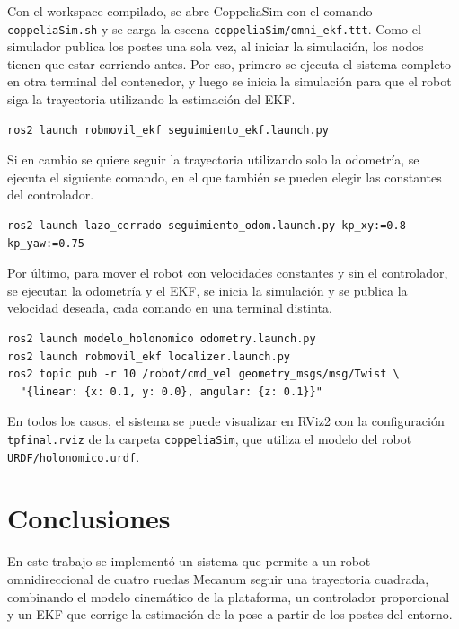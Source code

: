 \documentclass[11pt,a4paper]{article}
\begin{document}
Con el workspace compilado, se abre CoppeliaSim con el comando \texttt{coppeliaSim.sh} y se carga la escena \texttt{coppeliaSim/omni\_ekf.ttt}. Como el simulador publica los postes una sola vez, al iniciar la simulación, los nodos tienen que estar corriendo antes. Por eso, primero se ejecuta el sistema completo en otra terminal del contenedor, y luego se inicia la simulación para que el robot siga la trayectoria utilizando la estimación del EKF.

\begin{verbatim}
ros2 launch robmovil_ekf seguimiento_ekf.launch.py
\end{verbatim}

Si en cambio se quiere seguir la trayectoria utilizando solo la odometría, se ejecuta el siguiente comando, en el que también se pueden elegir las constantes del controlador.

\begin{verbatim}
ros2 launch lazo_cerrado seguimiento_odom.launch.py kp_xy:=0.8 kp_yaw:=0.75
\end{verbatim}

Por último, para mover el robot con velocidades constantes y sin el controlador, se ejecutan la odometría y el EKF, se inicia la simulación y se publica la velocidad deseada, cada comando en una terminal distinta.

\begin{verbatim}
ros2 launch modelo_holonomico odometry.launch.py
ros2 launch robmovil_ekf localizer.launch.py
ros2 topic pub -r 10 /robot/cmd_vel geometry_msgs/msg/Twist \
  "{linear: {x: 0.1, y: 0.0}, angular: {z: 0.1}}"
\end{verbatim}

En todos los casos, el sistema se puede visualizar en RViz2 con la configuración \texttt{tpfinal.rviz} de la carpeta \texttt{coppeliaSim}, que utiliza el modelo del robot \texttt{URDF/holonomico.urdf}.

\section{Conclusiones}

En este trabajo se implementó un sistema que permite a un robot omnidireccional de cuatro ruedas Mecanum seguir una trayectoria cuadrada, combinando el modelo cinemático de la plataforma, un controlador proporcional y un EKF que corrige la estimación de la pose a partir de los postes del entorno.
\end{document}
